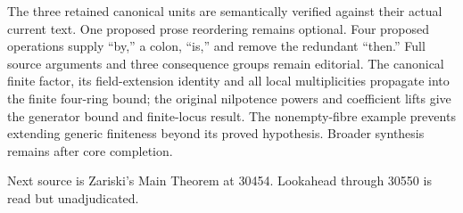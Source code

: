 The three retained canonical units are semantically verified against their actual current text. One proposed prose reordering remains optional. Four proposed operations supply ``by,'' a colon, ``is,'' and remove the redundant ``then.'' Full source arguments and three consequence groups remain editorial. The canonical finite factor, its field-extension identity and all local multiplicities propagate into the finite four-ring bound; the original nilpotence powers and coefficient lifts give the generator bound and finite-locus result. The nonempty-fibre example prevents extending generic finiteness beyond its proved hypothesis. Broader synthesis remains after core completion.

Next source is Zariski's Main Theorem at 30454. Lookahead through 30550 is read but unadjudicated.
